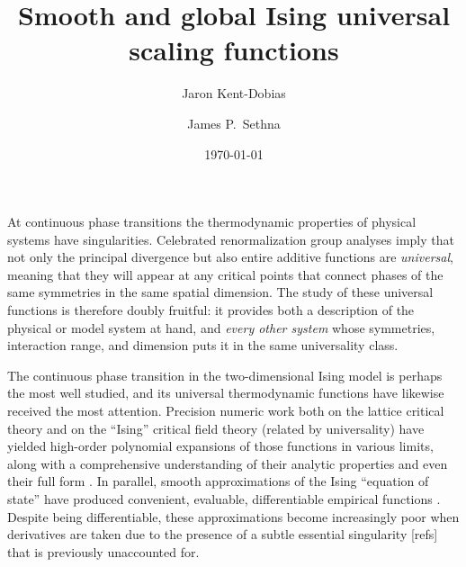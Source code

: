 \documentclass[
  aps,
  pre,
  preprint,
  longbibliography,
  floatfix
]{revtex4-2}
\begin{document}
\title{Smooth and global Ising universal scaling functions}

\author{Jaron Kent-Dobias}

\author{James P.~Sethna}

\date\today

\begin{abstract}
\end{abstract}

\maketitle

At continuous phase transitions the thermodynamic properties of physical
systems have singularities. Celebrated renormalization group analyses imply
that not only the principal divergence but also entire additive functions are
\emph{universal}, meaning that they will appear at any critical points that
connect phases of the same symmetries in the same spatial dimension. The study
of these universal functions is therefore doubly fruitful: it provides both a
description of the physical or model system at hand, and \emph{every other
system} whose symmetries, interaction range, and dimension puts it in the same
universality class.

The continuous phase transition in the two-dimensional Ising model is perhaps
the most well studied, and its universal thermodynamic functions have likewise
received the most attention. Precision numeric work both on the lattice
critical theory and on the ``Ising'' critical field theory (related by
universality) have yielded high-order polynomial expansions of those functions
in various limits, along with a comprehensive understanding of their analytic
properties and even their full form \cite{Fonseca_2003_Ising, Mangazeev_2008_Variational, Mangazeev_2010_Scaling}. In parallel, smooth approximations of the
Ising ``equation of state'' have produced convenient, evaluable, differentiable
empirical functions \cite{Guida_1997_3D, Campostrini_2000_Critical, Caselle_2001_The}. Despite being differentiable, these approximations become
increasingly poor when derivatives are taken due to the presence of a subtle
essential singularity [refs] that is previously unaccounted for.
\end{document}
